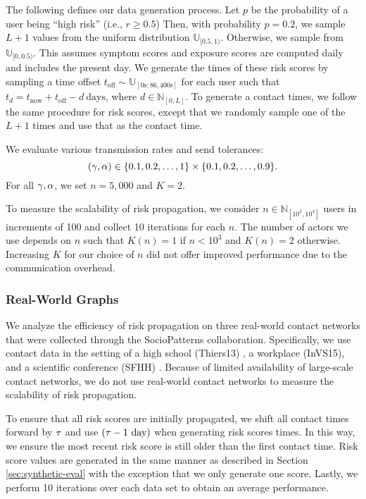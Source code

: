 The following defines our data generation process. Let $p$ be the probability of a user being ``high risk'' (i.e., $r \geq 0.5$) Then, with probability $p = 0.2$, we sample $L + 1$ values from the uniform distribution $\mathbb{U}_{[0.5, 1)}$. Otherwise, we sample from $\mathbb{U}_{[0, 0.5)}$. This assumes symptom scores and exposure scores are computed daily and includes the present day. We generate the times of these risk scores by sampling a time offset $t_{\text{off}} \sim \mathbb{U}_{[0\text{s}; 86,400\text{s}]}$ for each user such that $t_d = t_{\text{now}} + t_{\text{off}} - d~\text{days}$, where $d \in \mathbb{N}_{[0, L]}$. To generate a contact times, we follow the same procedure for risk scores, except that we randomly sample one of the $L + 1$ times and use that as the contact time.

We evaluate various transmission rates and send tolerances:
\begin{equation*}
  (\gamma, \alpha) \in \{0.1, 0.2, \ldots, 1\} \times \{0.1, 0.2, \ldots, 0.9\}.
\end{equation*}
For all $\gamma, \alpha$, we set $n = 5,000$ and $K = 2$.

To measure the scalability of risk propagation, we consider $n \in \mathbb{N}_{[10^2, 10^4]}$ users in increments of 100 and collect 10 iterations for each $n$. The number of actors we use depends on $n$ such that $K(n) = 1$ if $n < 10^3$ and $K(n) = 2$ otherwise. Increasing $K$ for our choice of $n$ did not offer improved performance due to the communication overhead.

\subsubsection{Real-World Graphs}

We analyze the efficiency of risk propagation on three real-world contact networks that were collected through the SocioPatterns collaboration. Specifically, we use contact data in the setting of a high school (Thiers13) \cite{Fournet2014}, a workplace (InVS15), and a scientific conference (SFHH) \cite{Genois2018}. Because of limited availability of large-scale contact networks, we do not use real-world contact networks to measure the scalability of risk propagation.

To ensure that all risk scores are initially propagated, we shift all contact times forward by $\tau$ and use $(\tau - 1 \text{ day})$ when generating risk scores times. In this way, we ensure the most recent risk score is still older than the first contact time. Risk score values are generated in the same manner as described in Section \ref{sec:synthetic-eval} with the exception that we only generate one score. Lastly, we perform 10 iterations over each data set to obtain an average performance.

